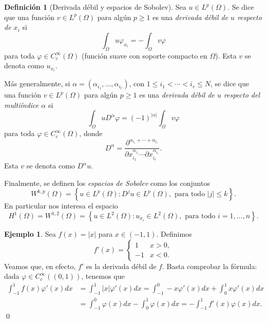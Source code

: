 \documentclass[12pt,a4paper]{book}
\theoremstyle{definition} \newtheorem{defn}[thm]{Definición}
\theoremstyle{definition} \newtheorem{ejemplo}[thm]{Ejemplo}
\theoremstyle{definition} \newtheorem{ejercicio}[thm]{Ejercicio}
\theoremstyle{remark} \newtheorem*{obs}{Observación}
\begin{document}
\begin{defn}[Derivada débil y espacios de Sobolev]
  Sea $u\in L^p(\Omega)$. Se dice que una función $v\in L^p(\Omega)$ para algún $p\geq 1$ es una \emph{derivada débil de $u$ respecto de $x_i$} si 
  \begin{equation*}
    \int_\Omega u \varphi_{x_i}= -\int_{\Omega} v \varphi
  \end{equation*}
  para toda $\varphi\in C^{\infty}_c(\Omega)$ (función suave con soporte compacto en $\Omega$). Esta $v$ se denota como $u_{x_i}$.

  Más generalmente, si $\alpha=(\alpha_{i_1},\dots,\alpha_{i_r})$, con $1\leq i_1 <\cdots < i_r \leq N$, se dice que una función $v\in L^p(\Omega)$ para algún $p\geq 1$ es una \emph{derivada débil de $u$ respecto del multiíndice $\alpha$}  si
  \begin{equation*}
    \int_{\Omega} u D^{\alpha} \varphi = (-1)^{|\alpha|} \int_{\Omega} v \varphi
  \end{equation*}
  para toda $\varphi \in C^{\infty}_c(\Omega)$, donde 
  \begin{equation*}
    D^{\alpha}=\frac{\partial^{\alpha_{i_1}+\cdots +\alpha_{i_r}}}{\partial x_{i_1}^{\alpha_{i_1}}\cdots \partial x_{i_r}^{\alpha_{i_r}}}.
  \end{equation*}
  Esta $v$ se denota como $D^\alpha u$.

  Finalmente, se definen los \emph{espacios de Sobolev} como los conjuntos
  \begin{equation*}
    W^{k,p}(\Omega)=\left\{ u \in L^p(\Omega): D^j u \in L^p(\Omega), \text{ para todo } |j|\leq k  \right\}.
  \end{equation*}
  En particular nos interesa el espacio
  \begin{equation*}
    H^1(\Omega)=W^{1,2}(\Omega)=\left\{ u \in L^2(\Omega) : u_{x_i} \in L^2(\Omega), \text{ para todo } i=1,\dots,n \right\}.
  \end{equation*}
\end{defn}

\begin{ejemplo}
  Sea $f(x)=|x|$ para $x\in (-1,1)$. Definimos
  \begin{equation*}
    f'(x)=
    \begin{cases}
      1 & x >0, \\
      -1 & x<0.
    \end{cases}
  \end{equation*}
  Veamos que, en efecto, $f'$ es la derivada débil de $f$. Basta comprobar la fórmula: dada $\varphi \in C^{\infty}_c((0,1))$, tenemos que
  \begin{align*}
    \int_{-1}^1 f(x) \varphi'(x) dx & = \int_{-1}^1 |x| \varphi'(x) dx = \int_{-1}^0 -x\varphi'(x) dx + \int_0^1 x \varphi'(x) dx \\ & = \int_{-1}^0 \varphi(x) dx - \int_0^1 \varphi(x) dx = -\int_{-1}^1 f'(x) \varphi(x) dx.
  \end{align*}
  \qed
\end{ejemplo}
\end{document}
